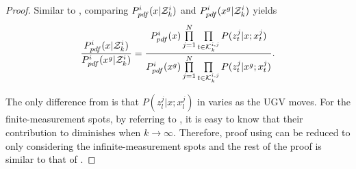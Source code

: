	\begin{proof}		
		Similar to , comparing $P^i_{pdf}(x|\mathcal{Z}^i_k)$ and $P^i_{pdf}(x^g|\mathcal{Z}^i_k)$ yields		
		\small\begin{equation}\label{eqn:cmp2}
		\frac{P^i_{pdf}(x|\mathcal{Z}^i_k)}{P^i_{pdf}(x^g|\mathcal{Z}^i_k)}=\frac{P^i_{pdf}(x)\prod\limits_{j=1}^{N}\prod\limits_{t\in\mathcal{K}^{i,j}_{k}}P(z^j_t|x;x^j_t)}{P^i_{pdf}(x^g)\prod\limits_{j=1}^{N}\prod\limits_{t\in\mathcal{K}^{i,j}_{k}}P(z^j_t|x^g;x^j_t)}.
		\end{equation}\normalsize
			
		The only difference from  is that $P(z^j_l|x;x^j_l)$ in  varies as the UGV moves.
		For the finite-measurement spots, by referring to , it is easy to know that their contribution to  diminishes when $k\rightarrow \infty$.
		Therefore, proof using  can be reduced to only considering the infinite-measurement spots and the rest of the proof is similar to that of .
		
	\end{proof}
			
